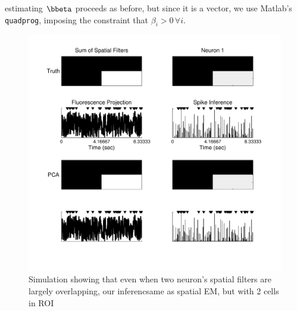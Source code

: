 estimating $\bbeta$ proceeds as before, but since it is a vector, we use Matlab's \texttt{quadprog}, imposing the constraint that $\beta_i>0 \, \forall i$.

\begin{figure}[H]
\centering \includegraphics[width=.9\linewidth]{../figs/spatial_multi}
\caption{Simulation showing that even when two neuron's spatial filters are largely overlapping, our inferencsame as spatial EM, but with 2 cells in ROI} \label{fig:spatial_multi}
\end{figure}


